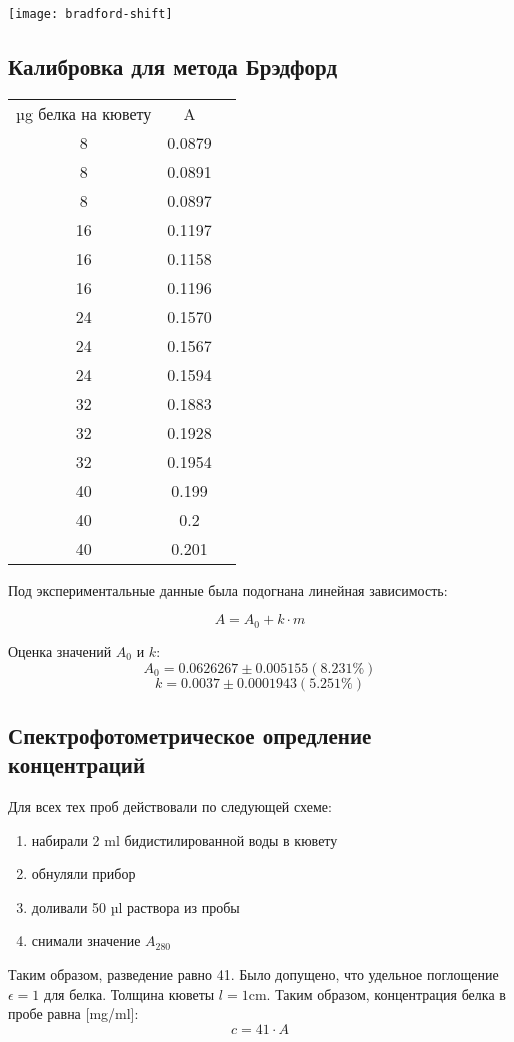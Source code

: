 \texttt{[image: bradford-shift]}

\subsection{Калибровка для метода Брэдфорд}
\label{A0k}

\begin{tabular}{|c|c|c|}
\hline
µg белка на кювету & A \\
8  &  0.0879 \\
8  &  0.0891 \\
8  &  0.0897 \\
\hline
16 &  0.1197 \\
16 &  0.1158 \\
16 &  0.1196 \\
\hline
24 &  0.1570 \\
24 &  0.1567 \\
24 &  0.1594 \\
\hline
32 &  0.1883 \\
32 &  0.1928 \\
32 &  0.1954 \\
\hline
40 &  0.199 \\
40 &  0.2 \\
40 &  0.201 \\
\hline
\end{tabular}

Под экспериментальные данные была подогнана линейная зависимость:

$$ A = A_0 + k \cdot m $$

Оценка значений $A_0$ и $k$:
$$ A_0 = 0.0626267 \pm 0.005155 (8.231\%) $$
$$ k = 0.0037 \pm 0.0001943 (5.251\%) $$



\subsection{Спектрофотометрическое опредление концентраций}
Для всех тех проб действовали по следующей схеме:
\begin{enumerate}
\item набирали 2 ml бидистилированной воды в кювету
\item обнуляли прибор
\item доливали 50 µl раствора из пробы
\item снимали значение $A_{280}$
\end{enumerate}
Таким образом, разведение равно 41.
Было допущено, что удельное поглощение $\epsilon = 1$ для белка.
Толщина кюветы $l = 1 \text{cm}$.
Таким образом, концентрация белка в пробе равна [mg/ml]:
$$ c=41 \cdot A $$


